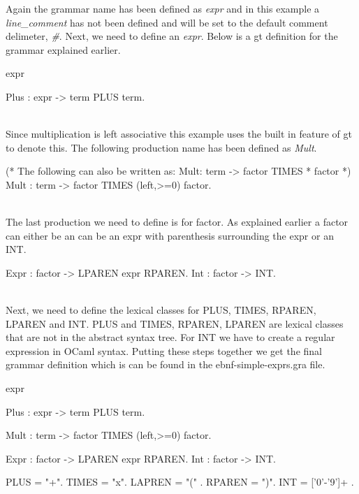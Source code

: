 Again the grammar name has been defined as \textit{expr} and in this example a \textit{line\_comment}
has not been defined and will be set to the default comment delimeter, \textit{\#}. Next, we need to define 
an \textit{expr}. Below is a gt definition for the grammar explained earlier. \\
%
%
%
\begin{gt} 
expr

Plus : expr -> term PLUS term.
\end{gt}\ \\
Since multiplication is left associative this example uses the built in feature of gt to denote this.
The following production name has been defined as \textit{Mult}.\\
\begin{gt} 
(* The following can also be written as:
Mult: term -> { factor TIMES }* factor *)
Mult : term -> { factor TIMES }(left,>=0) factor.
\end{gt}\ \\
%
%
The last production we need to define is for factor. As explained earlier a factor can either be 
an can be an expr with parenthesis surrounding the expr or an INT.\\
\begin{gt}
Expr : factor -> LPAREN expr RPAREN.
Int : factor -> INT.
\end{gt}\ \\
%
%
%
Next, we need to define the lexical classes for PLUS, TIMES, RPAREN, LPAREN and INT. PLUS and 
TIMES, RPAREN, LPAREN are lexical classes that are not in the abstract syntax tree. For 
INT we have to create a regular expression in OCaml syntax. Putting 
these steps together we get the final grammar definition which is can be found in the ebnf-simple-exprs.gra file.\\
%
\begin{gt} 
expr

Plus : expr -> term PLUS term.

Mult : term -> { factor TIMES }(left,>=0) factor.

Expr : factor -> LPAREN expr RPAREN.
Int : factor -> INT.

PLUS = "+".
TIMES = "x".
LAPREN = "(" .
RPAREN = ")".
INT = {{ ['0'-'9']+ }}.
\end{gt}
%
%






